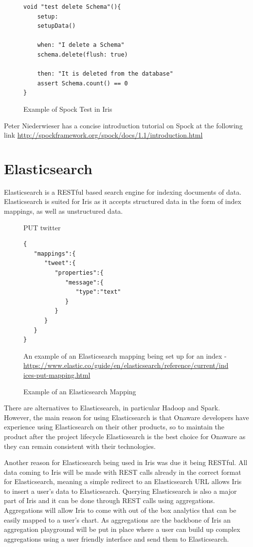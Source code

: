 \documentclass[12pt,a4paper,titlepage]{report}
\begin{document}
\begin{figure}[H]
\begin{tcolorbox}
\begin{verbatim}
void "test delete Schema"(){
	setup:
	setupData()

	when: "I delete a Schema"
	schema.delete(flush: true)

	then: "It is deleted from the database"
	assert Schema.count() == 0
}
\end{verbatim}
\end{tcolorbox}
\caption{Example of Spock Test in Iris}
\end{figure}
Peter Niederwieser has a concise introduction tutorial on Spock at the following link \url{ http://spockframework.org/spock/docs/1.1/introduction.html }

\section{Elasticsearch}

Elasticsearch is a RESTful based search engine for indexing documents of data. Elasticsearch is suited for Iris as it accepts structured data in the form of index mappings, as well as unstructured data. 

\begin{figure}[H]
\begin{tcolorbox}
PUT twitter
\begin{verbatim}
{
   "mappings":{
      "tweet":{
         "properties":{
            "message":{
               "type":"text"
            }
         }
      }
   }
}
\end{verbatim}
An example of an Elasticsearch mapping being set up for an index - \url{ https://www.elastic.co/guide/en/elasticsearch/reference/current/indices-put-mapping.html}
\end{tcolorbox}
\caption{Example of an Elasticsearch Mapping}
\end{figure}

There are alternatives to Elasticsearch, in particular  Hadoop and Spark. However, the main reason for using Elasticsearch is that Onaware developers have experience using Elasticsearch on their other products, so to maintain the product after the project lifecycle Elasticsearch is the best choice for Onaware as they can remain consistent with their technologies.

Another reason for Elasticsearch being used in Iris was due it being RESTful. All data coming to Iris will be made with REST calls already in the correct format for Elasticsearch, meaning a simple redirect to an Elasticsearch URL allows Iris to insert a user’s data to Elasticsearch. Querying Elasticsearch is also a major part of Iris and it can be done through REST calls using aggregations. Aggregations will allow Iris to come with out of the box analytics that can be easily mapped to a user's chart. As aggregations are the backbone of Iris an aggregation playground will be put in place where a user can build up complex aggregations using a user friendly interface and send them to Elasticsearch. 
\end{document}
